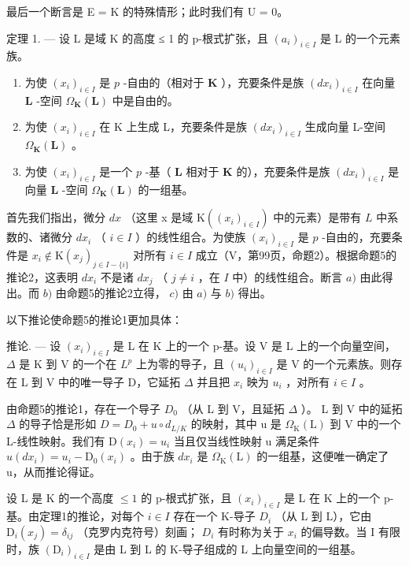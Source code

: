 最后一个断言是 E = K 的特殊情形；此时我们有 U = 0。

定理 1. --- 设 L 是域 K 的高度 ≤ 1 的 p-根式扩张，且 \((a_{i})_{i \in I}\) 是 L 的一个元素族。

\begin{enumerate}
\def\labelenumi{\alph{enumi})}
\item
  为使 \((x_{i})_{i\in I}\) 是 \(p\) -自由的（相对于 \(\mathbf{K}\) ），充要条件是族 \((dx_{i})_{i\in I}\) 在向量 \(\mathbf{L}\) -空间 \(\Omega_{\mathbf{K}}(\mathbf{L})\) 中是自由的。
\item
  为使 \((x_{i})_{i\in I}\) 在 K 上生成 L，充要条件是族 \((dx_{i})_{i\in I}\) 生成向量 L-空间 \(\Omega_{\mathbf{K}}(\mathbf{L})\) 。
\item
  为使 \((x_{i})_{i\in I}\) 是一个 \(p\) -基（ \(\mathbf{L}\) 相对于 \(\mathbf{K}\) 的），充要条件是族 \((dx_{i})_{i\in I}\) 是向量 \(\mathbf{L}\) -空间 \(\Omega_{\mathbf{K}}(\mathbf{L})\) 的一组基。
\end{enumerate}

首先我们指出，微分 \(dx\) （这里 x 是域 \(\mathrm{K}((x_i)_{i \in I})\) 中的元素）是带有 \(L\) 中系数的、诸微分 \(dx_i\) （ \(i \in I\) ）的线性组合。为使族 \((x_i)_{i \in I}\) 是 \(p\) -自由的，充要条件是 \(x_i \notin \mathrm{K}(x_j)_{j \in I - \{i\}}\) 对所有 \(i \in I\) 成立（V，第99页，命题2）。根据命题5的推论2，这表明 \(dx_i\) 不是诸 \(dx_j\) （ \(j \neq i\) ，在 \(I\) 中）的线性组合。断言 \(a)\) 由此得出。而 \(b)\) 由命题5的推论2立得， \(c)\) 由 \(a)\) 与 \(b)\) 得出。

以下推论使命题5的推论1更加具体：

推论. --- 设 \((x_{i})_{i\in I}\) 是 L 在 K 上的一个 p-基。设 V 是 L 上的一个向量空间， \(\Delta\) 是 K 到 V 的一个在 \(L^{p}\) 上为零的导子，且 \((u_{i})_{i\in I}\) 是 V 的一个元素族。则存在 L 到 V 中的唯一导子 D，它延拓 \(\Delta\) 并且把 \(x_{i}\) 映为 \(u_{i}\) ，对所有 \(i\in I\) 。

由命题5的推论1，存在一个导子 \(D_{0}\) （从 L 到 V，且延拓 \(\Delta\) ）。 L 到 V 中的延拓 \(\Delta\) 的导子恰是形如 \(D = D_{0} + u \circ d_{L/K}\) 的映射，其中 u 是 \(\Omega_{\mathrm{K}}(\mathrm{L})\) 到 V 中的一个 L-线性映射。我们有 \(\mathrm{D}(x_{i}) = u_{i}\) 当且仅当线性映射 u 满足条件 \(u(dx_{i}) = u_{i} - \mathrm{D}_{0}(x_{i})\) 。由于族 \(dx_{i}\) 是 \(\Omega_{\mathrm{K}}(\mathrm{L})\) 的一组基，这便唯一确定了 u，从而推论得证。

设 L 是 K 的一个高度 \(\leqslant1\) 的 p-根式扩张，且 \((x_{i})_{i\in I}\) 是 L 在 K 上的一个 p-基。由定理1的推论，对每个 \(i\in I\) 存在一个 K-导子 \(D_{i}\) （从 L 到 L），它由 \(\mathrm{D}_{i}(x_{j})=\delta_{ij}\) （克罗内克符号）刻画； \(D_{i}\) 有时称为关于 \(x_{i}\) 的偏导数。当 I 有限时，族 \((\mathrm{D}_{i})_{i\in I}\) 是由 L 到 L 的 K-导子组成的 L 上向量空间的一组基。

